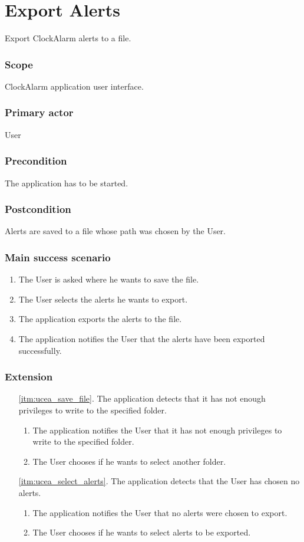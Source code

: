 \section{Export Alerts}\label{subsec:usecase_export_alerts}
Export ClockAlarm alerts to a file.
\subsubsection{Scope}
ClockAlarm application user interface.
\subsubsection{Primary actor}
User
\subsubsection{Precondition}
The application has to be started.
\subsubsection{Postcondition}
Alerts are saved to a file whose path was chosen by the User.
\subsubsection{Main success scenario}
\begin{enumerate}
	\item\label{itm:ucea_save_file} The User is asked where he wants to save the file.
	\item\label{itm:ucea_select_alerts} The User selects the alerts he wants to export.
	\item The application exports the alerts to the file.
	\item The application notifies the User that the alerts have been exported successfully.
\end{enumerate}
\subsubsection{Extension}
\begin{enumerate}
	\item[\ref{itm:ucea_save_file}.] The application detects that it has not enough privileges to write to the specified folder.
	\begin{enumerate}[i]
		\item The application notifies the User that it has not enough privileges to write to the specified folder.
		\item The User chooses if he wants to select another folder.
	\end{enumerate}
	\item[\ref{itm:ucea_select_alerts}.] The application detects that the User has chosen no alerts.
	\begin{enumerate}[i]
		\item The application notifies the User that no alerts were chosen to export.
		\item The User chooses if he wants to select alerts to be exported.
	\end{enumerate}
\end{enumerate}

